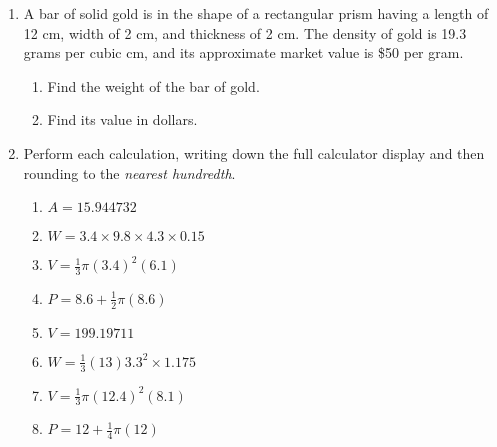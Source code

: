 \documentclass[12pt, twoside]{article}
\begin{document}
\begin{enumerate}
  \item A bar of solid gold is in the shape of a rectangular prism having a length of 12 cm, width of 2 cm, and thickness of 2 cm. The density of gold is 19.3 grams per cubic cm, and its approximate market value is \$50 per gram.
  \begin{enumerate}
    \item Find the weight of the bar of gold.  \vspace{3cm}
    \item Find its value in dollars.
  \end{enumerate}

\newpage
  \item Perform each calculation, writing down the full calculator display and then rounding to the \emph{nearest hundredth}.
    \begin{multicols}{2}
    \begin{enumerate}[itemsep=4cm]
      \item $A=15.944732$
      \item $W=3.4 \times 9.8 \times 4.3 \times 0.15$
            
      \item $V=\frac{1}{3} \pi (3.4)^2(6.1)$
      \item $P=8.6 + \frac{1}{2} \pi (8.6)$  
      \item $V=199.19711$
      \item $W=\frac{1}{3} (13)  3.3^2 \times 1.175$
      \item $V=\frac{1}{3} \pi (12.4)^2(8.1)$
      \item $P=12 + \frac{1}{4} \pi (12)$ 
    \end{enumerate}
    \end{multicols}\vspace{2cm}


\end{enumerate}
\end{document}
